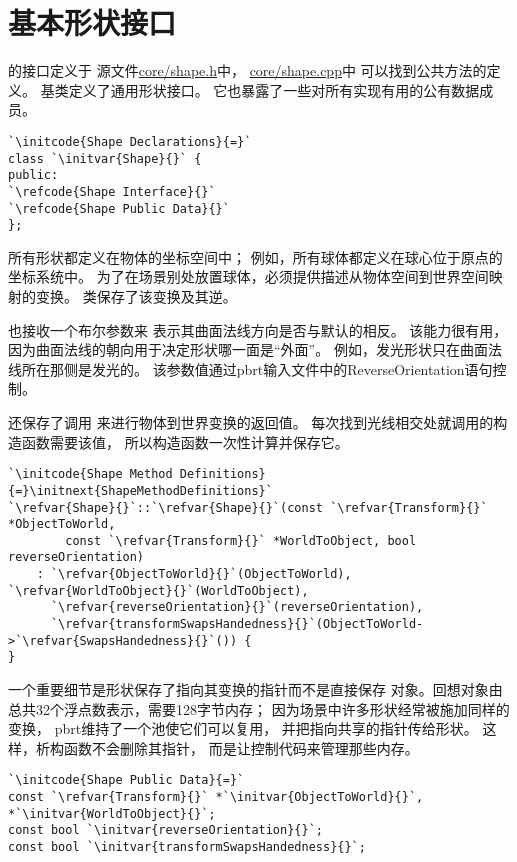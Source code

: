 \section{基本形状接口}\label{sec:基本形状接口}

的接口定义于
源文件\href{https://github.com/mmp/pbrt-v3/tree/master/src/core/shape.h}{\ttfamily core/shape.h}中，
\href{https://github.com/mmp/pbrt-v3/tree/master/src/core/shape.cpp}{\ttfamily core/shape.cpp}中
可以找到公共方法的定义。
基类定义了通用形状接口。
它也暴露了一些对所有实现有用的公有数据成员。
\begin{lstlisting}
`\initcode{Shape Declarations}{=}`
class `\initvar{Shape}{}` {
public:
`\refcode{Shape Interface}{}`
`\refcode{Shape Public Data}{}`
};
\end{lstlisting}

所有形状都定义在物体的坐标空间中；
例如，所有球体都定义在球心位于原点的坐标系统中。
为了在场景别处放置球体，必须提供描述从物体空间到世界空间映射的变换。
类保存了该变换及其逆。

也接收一个布尔参数来
表示其曲面法线方向是否与默认的相反。
该能力很有用，因为曲面法线的朝向用于决定形状哪一面是“外面”。
例如，发光形状只在曲面法线所在那侧是发光的。
该参数值通过pbrt输入文件中的{\ttfamily ReverseOrientation}语句控制。

还保存了调用
来进行物体到世界变换的返回值。
每次找到光线相交处就调用的构造函数需要该值，
所以构造函数一次性计算并保存它。
\begin{lstlisting}
`\initcode{Shape Method Definitions}{=}\initnext{ShapeMethodDefinitions}`
`\refvar{Shape}{}`::`\refvar{Shape}{}`(const `\refvar{Transform}{}` *ObjectToWorld,
        const `\refvar{Transform}{}` *WorldToObject, bool reverseOrientation)
    : `\refvar{ObjectToWorld}{}`(ObjectToWorld), `\refvar{WorldToObject}{}`(WorldToObject),
      `\refvar{reverseOrientation}{}`(reverseOrientation),
      `\refvar{transformSwapsHandedness}{}`(ObjectToWorld->`\refvar{SwapsHandedness}{}`()) {
}
\end{lstlisting}

一个重要细节是形状保存了指向其变换的指针而不是直接保存
对象。回想对象由总共32个浮点数表示，需要128字节内存；
因为场景中许多形状经常被施加同样的变换，
pbrt维持了一个池使它们可以复用，
并把指向共享的指针传给形状。
这样，析构函数不会删除其指针，
而是让控制代码来管理那些内存。
\begin{lstlisting}
`\initcode{Shape Public Data}{=}`
const `\refvar{Transform}{}` *`\initvar{ObjectToWorld}{}`, *`\initvar{WorldToObject}{}`;
const bool `\initvar{reverseOrientation}{}`;
const bool `\initvar{transformSwapsHandedness}{}`;
\end{lstlisting}

